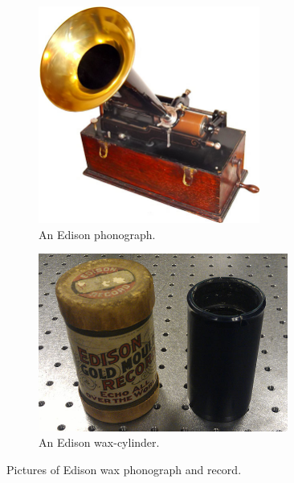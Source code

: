 \begin{figure}[!ht]
    \begin{subfigure}[b]{0.45\textwidth}
    \centering
    \includegraphics[width=0.8\textwidth]{images/edison-phonograph}
    \caption{An Edison phonograph.}
    \label{fig:edisonphono}
    \end{subfigure}
    \begin{subfigure}[b]{0.45\textwidth}
    \centering
    \includegraphics[width=0.9\textwidth]{images/edison-cylinder}
    \caption{An Edison wax-cylinder.}
    \label{fig:edisoncyl}
    \end{subfigure}
    \caption{Pictures of Edison wax phonograph and record.}
    \label{fig:edisonphonocyl}
\end{figure}

